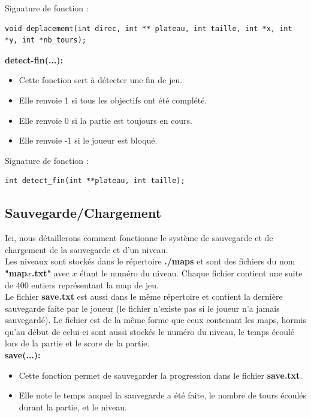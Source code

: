 \documentclass[12pt,french]{article}
\begin{document}
Signature de fonction :
\begin{lstlisting}
void deplacememt(int direc, int ** plateau, int taille, int *x, int *y, int *nb_tours);
\end{lstlisting}

\textbf{detect-fin(...):}
\begin{itemize}
\item Cette fonction sert à détecter une fin de jeu.
\item Elle renvoie 1 si tous les objectifs ont été complété.
\item Elle renvoie 0 si la partie est toujours en cours.
\item Elle renvoie -1 si le joueur est bloqué.
\end{itemize}

Signature de fonction :
\begin{lstlisting}
int detect_fin(int **plateau, int taille);
\end{lstlisting}


\newpage

\subsection{Sauvegarde/Chargement}

Ici, nous détaillerons comment fonctionne le système de sauvegarde et de chargement de la sauvegarde et d'un niveau.\\
Les niveaux sont stockés dans le répertoire \textbf{./maps} et sont des fichiers du nom \textbf{"map$x$.txt"} avec $x$ étant le numéro du niveau. Chaque fichier contient une suite de 400 entiers représentant la map de jeu.\\
Le fichier \textbf{save.txt} est aussi dans le même répertoire et contient la dernière sauvegarde faite par le joueur (le fichier n'existe pas si le joueur n'a jamais sauvegardé). Le fichier est de la même forme que ceux contenant les maps, hormis qu'au début de celui-ci sont aussi stockés le numéro du niveau, le temps écoulé lors de la partie et le score de la partie.\\
\newline
\textbf{save(...):}
\begin{itemize}
\item Cette fonction permet de sauvegarder la progression dans le fichier \textbf{save.txt}.
\item Elle note le temps auquel la sauvegarde a été faite, le nombre de tours écoulés durant la partie, et le niveau.
\end{itemize}
\end{document}
